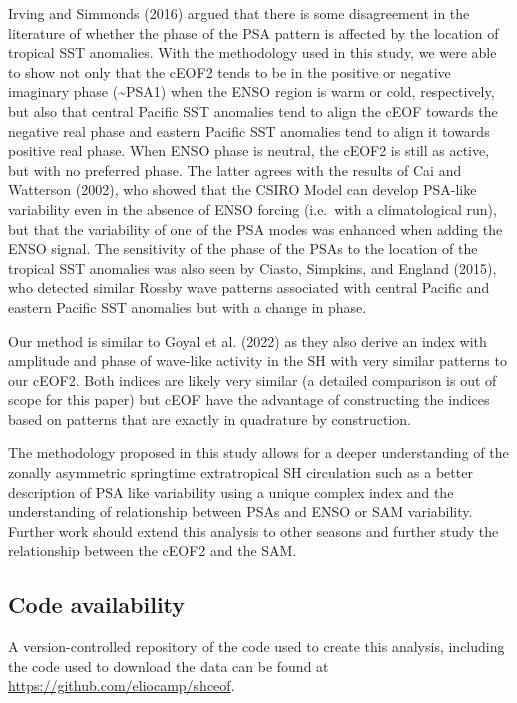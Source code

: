 \documentclass[smallextended]{svjour3}       %
\begin{document}
Irving and Simmonds (2016) argued that there is some disagreement in the literature of whether the phase of the PSA pattern is affected by the location of tropical SST anomalies.
With the methodology used in this study, we were able to show not only that the cEOF2 tends to be in the positive or negative imaginary phase (\textasciitilde PSA1) when the ENSO region is warm or cold, respectively, but also that central Pacific SST anomalies tend to align the cEOF towards the negative real phase and eastern Pacific SST anomalies tend to align it towards positive real phase.
When ENSO phase is neutral, the cEOF2 is still as active, but with no preferred phase.
The latter agrees with the results of Cai and Watterson (2002), who showed that the CSIRO Model can develop PSA-like variability even in the absence of ENSO forcing (i.e.~with a climatological run), but that the variability of one of the PSA modes was enhanced when adding the ENSO signal.
The sensitivity of the phase of the PSAs to the location of the tropical SST anomalies was also seen by Ciasto, Simpkins, and England (2015), who detected similar Rossby wave patterns associated with central Pacific and eastern Pacific SST anomalies but with a change in phase.

Our method is similar to Goyal et al. (2022) as they also derive an index with amplitude and phase of wave-like activity in the SH with very similar patterns to our cEOF2.
Both indices are likely very similar (a detailed comparison is out of scope for this paper) but cEOF have the advantage of constructing the indices based on patterns that are exactly in quadrature by construction.

The methodology proposed in this study allows for a deeper understanding of the zonally asymmetric springtime extratropical SH circulation such as a better description of PSA like variability using a unique complex index and the understanding of relationship between PSAs and ENSO or SAM variability.
Further work should extend this analysis to other seasons and further study the relationship between the cEOF2 and the SAM.

\hypertarget{code-availability}{%
\subsection*{Code availability}\label{code-availability}}

A version-controlled repository of the code used to create this analysis, including the code used to download the data can be found at \url{https://github.com/eliocamp/shceof}.
\end{document}
